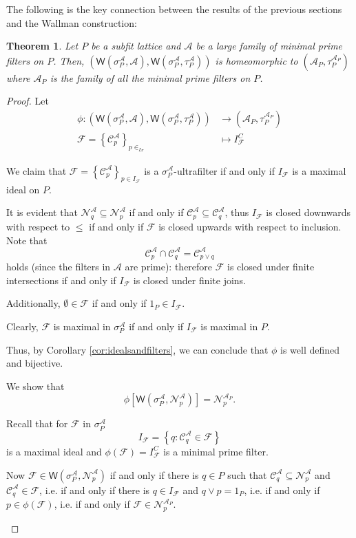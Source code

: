 \documentclass{article}
\newcommand{\aaa}{\mathcal{A} }
\newcommand{\open}[1]{\mathcal{N}^{\mathcal{A}}_{#1}}
\newcommand{\closed}[1]{\mathcal{C}^{\mathcal{A}}_{#1}}
\newcommand{\wall}[2]{\mathsf{W}(#1,#2)}
\newcommand{\spa}{\sigma^\aaa_P}
\theoremstyle{plain}
\newtheorem{theorem}{Theorem}[subsection]
\theoremstyle{definition}
\theoremstyle{remark}
\newcommand{\bp}[1]{\left\lbrace #1 \right\rbrace}
\newcommand{\0}{\mathbbm 0}
\newcommand{\1}{\mathbbm 1}
\newcommand{\2}{\mathbbm 2}
\begin{document}
\smallskip



The following is the key connection between the results of the previous sections and the Wallman construction:
\begin{theorem}
\label{thm:wallmancompactification-lattice}
Let $P$ be a subfit lattice and $\aaa$ be a large  family of minimal prime filters on $P$. Then, $(\wall{\spa}{\aaa},\wall{\spa}{\tau^\aaa_P} )$ is homeomorphic to $(\aaa_P, \tau^{\aaa_P}_P)$ where $\aaa_P$ is the family of \emph{all} the minimal prime filters on $P$.
\end{theorem}
 
\begin{proof}
Let 
\begin{align*}
    \phi: (\wall{\spa}{\aaa},\wall{\spa}{\tau^\aaa_P} ) &\to (\aaa_P, \tau^{\aaa_P}_P)\\
    \mathcal{F}=\bp{\closed{p}}_{p \in _{I_\mathcal{F}}}&\mapsto I_\mathcal{F}^C
\end{align*} 
\begin{description}[font=\normalfont\itshape]
        \item[$\phi$ is well defined and bijective.]
        We claim that $\mathcal{F}=\bp{\closed{p}}_{p \in I_{\mathcal{F}}}$ is a $\spa$-ultrafilter if and only if $I_{\mathcal{F}}$ is a maximal ideal on $P$. 
        
     It is evident that $\open{q} \subseteq \open{p}$ if and only if $\closed{p}\subseteq \closed{q}$, thus $I_{\mathcal{F}}$ is closed downwards with respect to $\leq$ if and only if $\mathcal{F}$ is closed upwards with respect to inclusion. Note that 
\[
\closed{p} \cap \closed{q} = \closed{p \vee q}
\]
holds (since the filters in $\mathcal{A}$ are prime): therefore $\mathcal{F}$ is closed under finite intersections if and only if $I_{\mathcal{F}}$ is closed under finite joins. 

Additionally, $\emptyset \in \mathcal{F}$ if and only if $1_P \in I_{\mathcal{F}}$.

Clearly, $\mathcal{F}$ is maximal in $\spa$ if and only if $I_{\mathcal{F}}$ is maximal in $P$.

 Thus, by Corollary \ref{cor:idealsandfilters}, we can conclude that $\phi$ is well defined and bijective.  
 
        \item[$\phi$ is  open and continuous.]
We show that 
\[
\phi[\wall{\spa}{\open{p}}]
=\mathcal{N}^{\aaa_P}_p.
\] 


Recall that for $\mathcal{F}$ in $\spa$
\[
I_{\mathcal{F}}=\bp{q: \closed{q}\in\mathcal{F}}
\]
is a maximal ideal and $\phi(\mathcal{F})=I_\mathcal{F}^C$ is a minimal prime filter.

Now $\mathcal{F} \in \wall{\spa}{\open{p}}$ if and only if there is
$q \in P$ such that $\closed{q}\subseteq\open{p}$ and $\closed{q} \in \mathcal{F}$, i.e. if and only if there is $q\in I_\mathcal{F}$ and $q\vee p=1_P$, i.e. if and only if $p \in \phi(\mathcal{F})$, i.e. if and only if
$\mathcal{F} \in \mathcal{N}^{\aaa_P}_p$.



\end{description}
\end{proof}
\end{document}

